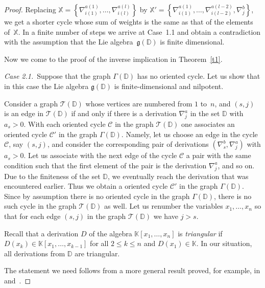 \documentclass[a4paper, 12pt,oneside,reqno]{amsart}
\numberwithin{equation}{section}
\theoremstyle{definition}
\begin{document}
\begin{proof}
Replacing $\mathbb{X}=\left\{\nabla^{a(1)}_{i(1)},\ldots,\nabla^{a(l)}_{i(l)}\right \}$ by $\mathbb{X}'=\left\{\nabla^{a(1)}_{i(1)},\ldots, \nabla^{a(l-2)}_{i (l-2)},\nabla^b_j\right\}$, we get a shorter cycle whose sum of weights is the same as that of the elements of~$\mathbb{X}$. In a finite number of steps we arrive at Case~1.1 and obtain a contradiction with the assumption that the Lie algebra~$\mathfrak{g}(\mathbb{D})$ is finite dimensional.

\smallskip

Now we come to the proof of the inverse implication in Theorem~\ref{t1}.

\smallskip

{\it Case 2.1.}\ Suppose that the graph $\Gamma(\mathbb{D})$ has no oriented cycle. Let us show that in this case the Lie algebra $\mathfrak{g}(\mathbb{D})$ is finite-dimensional and nilpotent.

Consider a graph $\mathcal{T}(\mathbb{D})$ whose vertices are numbered from $1$ to~$n$, and $(s,j)$ is an edge in $\mathcal{T}(\mathbb{D})$ if and only if there is a derivation $\nabla^a_j$ in the set $\mathbb {D}$ with $a_s>0$. With each oriented cycle $\mathcal{C}$ in the graph $\mathcal{T}(\mathbb{D})$ one associates an oriented cycle $\mathcal{C}'$ in the graph $\Gamma(\mathbb{D})$. Namely, let us choose an edge in the cycle $\mathcal{C}$, say $(s,j)$, and consider the corresponding pair of derivations $(\nabla^b_s,\nabla^a_j)$ with $a_s>0$. Let us associate with the next edge of the cycle $\mathcal{C}$ a pair with the same condition such that the first element of the pair is the derivation $\nabla^a_j$, and so on. Due to the finiteness of the set $\mathbb{D}$, we  eventually reach the derivation that was encountered earlier. Thus we obtain a oriented cycle $\mathcal{C}'$ in the graph $\Gamma(\mathbb{ D})$. Since by assumption there is no oriented cycle in the graph $\Gamma(\mathbb{D})$, there is no such cycle in the graph $\mathcal{T}(\mathbb{D})$ as well. Let us renumber the variables $x_1,\ldots, x_n$ so that for each edge $(s,j)$ in the graph $\mathcal{T}(\mathbb{D})$ we have $j>s$.

Recall that a derivation $D$ of the algebra $\mathbb{K}[x_1,\ldots,x_n]$ is \emph{triangular} if $D(x_k)\in\mathbb{K}[x_1,\ldots,x_ {k-1}]$ for all $2\le k\le n$ and $D(x_1)\in\mathbb{K}$.
In our situation, all derivations from $\mathbb{D}$ are triangular.

The statement we need follows from a more general result proved, for example, in \cite[Corollary~2]{ASh} and~\cite[Proposition~15.2.5]{FK}.


\end{proof}
\end{document}

